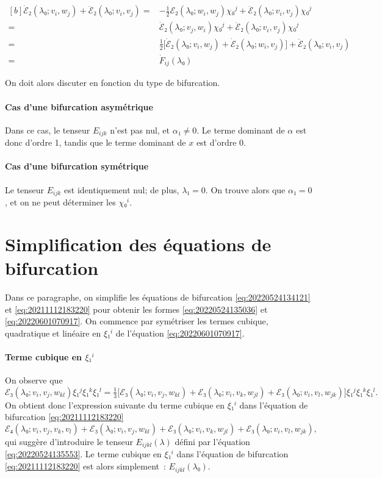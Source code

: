 \documentclass[12pt, final]{scrartcl}
\theoremstyle{definition}
\begin{document}
\begin{equation*}
  \begin{aligned}[b]
    \dot{ℰ}₂(λ₀; v_i, w_j) + \ddot{ℰ}₂(λ₀; v_i, v_j)
    ={} & -\tfrac{1}{2}ℰ₂(λ₀; w_i, w_j) χ₀^j + \ddot{ℰ}₂(λ₀; v_i, v_j) χ₀^j\\
    ={} & \dot{ℰ}₂(λ₀; v_j, w_i) χ₀^j + \ddot{ℰ}₂(λ₀; v_i, v_j) χ₀^j\\
    ={} & \tfrac{1}{2}\bigl[\dot{ℰ}₂(λ₀; v_i, w_j) + \dot{ℰ}₂(λ₀; w_i, v_j)\bigr] + \ddot{ℰ}₂(λ₀; v_i, v_j)\\
    ={} & \dot{F}_{ij}(λ₀)
  \end{aligned}
\end{equation*}


 On
doit alors discuter en fonction du type de bifurcation.

\paragraph{Cas d'une bifurcation asymétrique} Dans ce cas, le tenseur
\(E_{ijk}\) n'est pas nul, et \(α₁ \neq 0\). Le terme dominant de \(α\) est donc
d'ordre 1, tandis que le terme dominant de \(x\) est d'ordre 0.

\paragraph{Cas d'une bifurcation symétrique} Le tenseur \(E_{ijk}\) est
identiquement nul; de plus, \(λ₁ = 0\). On trouve alors que \(α₁ = 0\), et on ne
peut déterminer les \(χ₀^i\).


\section{Simplification des équations de bifurcation}
\label{sec:20220524134954}

Dans ce paragraphe, on simplifie les équations de bifurcation
\eqref{eq:20220524134121} et \eqref{eq:20211112183220} pour obtenir les formes
\eqref{eq:20220524135036} et \eqref{eq:20220601070917}. On commence par
symétriser les termes cubique, quadratique et linéaire en \(ξ₁^i\) de l'équation
\eqref{eq:20220601070917}.

\paragraph{Terme cubique en \(ξ₁^i\)} On observe que
\begin{equation}
  ℰ₃(λ₀; v_i, v_j, w_{k l}) ξ₁^j ξ₁^k ξ₁^l = \tfrac{1}{3} \bigl[ℰ₃(λ₀; v_i, v_j, w_{k l}) + ℰ₃(λ₀; v_i, v_k, w_{j l}) + ℰ₃(λ₀; v_i, v_l, w_{j k})\bigr] ξ₁^j ξ₁^k ξ₁^l.
\end{equation}
On obtient donc l'expression suivante du terme cubique en \(ξ₁^i\) dans
l'équation de bifurcation \eqref{eq:20211112183220}
\begin{equation}
  ℰ₄(λ₀; v_i, v_j, v_k, v_l) + ℰ₃(λ₀ ; v_i, v_j, w_{k l}) + ℰ₃(λ₀; v_i, v_k, w_{j l}) + ℰ₃(λ₀; v_i, v_l, w_{j k}),
\end{equation}
qui suggère d'introduire le tenseur \(E_{ijkl}(λ)\) défini par l'équation
\eqref{eq:20220524135553}. Le terme cubique en \(ξ₁^i\) dans l'équation de
bifurcation \eqref{eq:20211112183220} est alors simplement~: \(E_{ijkl}(λ₀)\).
\end{document}
